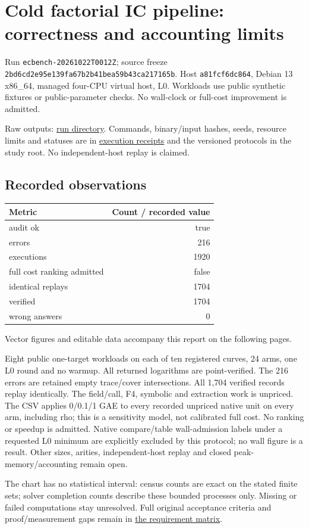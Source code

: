 \documentclass[
  10pt,
  letterpaper,
  landscape]{article}
\author{}
\date{}
\begin{document}
\section{Cold factorial IC pipeline: correctness and accounting
limits}\label{cold-factorial-ic-pipeline-correctness-and-accounting-limits}

Run \texttt{ecbench-20261022T0012Z}; source freeze
\texttt{2bd6cd2e95e139fa67b2b41bea59b43ca217165b}. Host
\texttt{a81fcf6dc864}, Debian 13 x86\_64, managed four-CPU virtual host,
L0. Workloads use public synthetic fixtures or public-parameter checks.
No wall-clock or full-cost improvement is admitted.

Raw outputs:
\href{../../../execution-v1/runs/ecbench-20261022T0012Z/}{run
directory}. Commands, binary/input hashes, seeds, resource limits and
statuses are in \href{../../../execution-v1/}{execution receipts} and
the versioned protocols in the study root. No independent-host replay is
claimed.

\subsection{Recorded observations}\label{recorded-observations}

\begin{longtable}[]{@{}lr@{}}
\toprule\noalign{}
Metric & Count / recorded value \\
\midrule\noalign{}
\endhead
\bottomrule\noalign{}
\endlastfoot
audit ok & true \\
errors & 216 \\
executions & 1920 \\
full cost ranking admitted & false \\
identical replays & 1704 \\
verified & 1704 \\
wrong answers & 0 \\
\end{longtable}

Vector figures and editable data accompany this report on the following pages.

Eight public one-target workloads on each of ten registered curves, 24
arms, one L0 round and no warmup. All returned logarithms are
point-verified. The 216 errors are retained empty trace/cover
intersections. All 1,704 verified records replay identically. The
field/call, F4, symbolic and extraction work is unpriced. The CSV
applies 0/0.1/1 GAE to every recorded unpriced native unit on every arm,
including rho; this is a sensitivity model, not calibrated full cost. No
ranking or speedup is admitted. Native compare/table wall-admission
labels under a requested L0 minimum are explicitly excluded by this
protocol; no wall figure is a result. Other sizes, arities,
independent-host replay and closed peak-memory/accounting remain open.

The chart has no statistical interval: census counts are exact on the
stated finite sets; solver completion counts describe these bounded
processes only. Missing or failed computations stay unresolved. Full
original acceptance criteria and proof/measurement gaps remain in
\href{../../../EXPERIMENTS.md}{the requirement matrix}.
\end{document}
